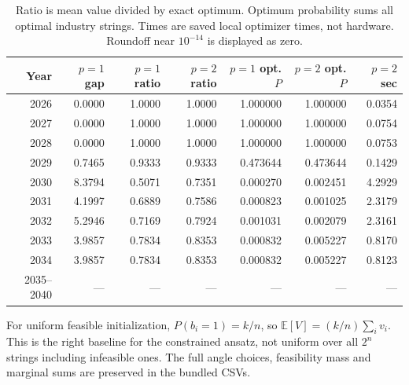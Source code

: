 \documentclass[11pt,letterpaper]{article}
\newcommand{\E}{\mathbb{E}}
\begin{document}
\begin{table}[H]\centering\small
\begin{tabular}{@{}rrrrrrr@{}}\toprule
Year & $p=1$ gap & $p=1$ ratio & $p=2$ ratio & $p=1$ opt. $P$ & $p=2$ opt. $P$ & $p=2$ sec\\\midrule
2026 & 0.0000 & 1.0000 & 1.0000 & 1.000000 & 1.000000 & 0.0354 \\
2027 & 0.0000 & 1.0000 & 1.0000 & 1.000000 & 1.000000 & 0.0754 \\
2028 & 0.0000 & 1.0000 & 1.0000 & 1.000000 & 1.000000 & 0.0753 \\
2029 & 0.7465 & 0.9333 & 0.9333 & 0.473644 & 0.473644 & 0.1429 \\
2030 & 8.3794 & 0.5071 & 0.7351 & 0.000270 & 0.002451 & 4.2929 \\
2031 & 4.1997 & 0.6889 & 0.7586 & 0.000823 & 0.001025 & 2.3179 \\
2032 & 5.2946 & 0.7169 & 0.7924 & 0.001031 & 0.002079 & 2.3161 \\
2033 & 3.9857 & 0.7834 & 0.8353 & 0.000832 & 0.005227 & 0.8170 \\
2034 & 3.9857 & 0.7834 & 0.8353 & 0.000832 & 0.005227 & 0.8123 \\
2035--2040 & --- & --- & --- & --- & --- & --- \\
\bottomrule\end{tabular}
\caption{Ratio is mean value divided by exact optimum. Optimum probability sums all optimal industry strings. Times are saved local optimizer times, not hardware. Roundoff near $10^{-14}$ is displayed as zero.}
\end{table}

For uniform feasible initialization, $P(b_i=1)=k/n$, so $\E[V]=(k/n)\sum_i v_i$. This is the right baseline for the constrained ansatz, not uniform over all $2^n$ strings including infeasible ones. The full angle choices, feasibility mass and marginal sums are preserved in the bundled CSVs.
\end{document}
